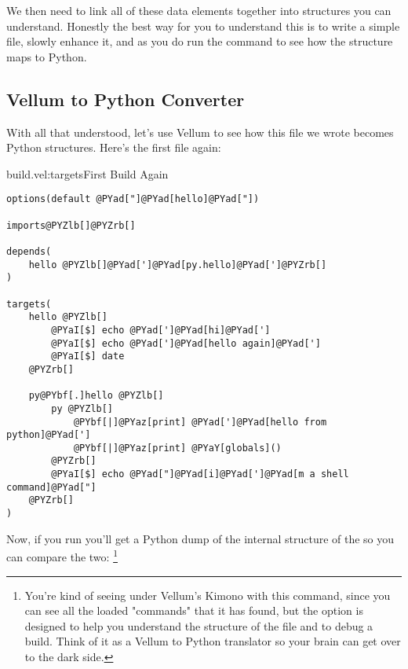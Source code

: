 We then need to link all of these data elements together into structures you can
understand.  Honestly the best way for you to understand this is to write a
simple  file, slowly enhance it, and as you do run the
 command to see how the structure maps to Python.

\subsection{Vellum to Python Converter}

With all that understood, let's use Vellum to see how this file we wrote becomes
Python structures.  Here's the first  file again:

\begin{code}{build.vel:targets}{First Build Again}
\begin{Verbatim}[commandchars=@\[\]]
options(default @PYad["]@PYad[hello]@PYad["])

imports@PYZlb[]@PYZrb[] 

depends(
    hello @PYZlb[]@PYad[']@PYad[py.hello]@PYad[']@PYZrb[]
)

targets(
    hello @PYZlb[]
        @PYaI[$] echo @PYad[']@PYad[hi]@PYad[']
        @PYaI[$] echo @PYad[']@PYad[hello again]@PYad[']
        @PYaI[$] date
    @PYZrb[]

    py@PYbf[.]hello @PYZlb[]
        py @PYZlb[] 
            @PYbf[|]@PYaz[print] @PYad[']@PYad[hello from python]@PYad[']
            @PYbf[|]@PYaz[print] @PYaY[globals]()
        @PYZrb[]
        @PYaI[$] echo @PYad["]@PYad[i]@PYad[']@PYad[m a shell command]@PYad["]
    @PYZrb[]
)
\end{Verbatim}

\end{code}

Now, if you run  you'll get a Python dump of the internal
structure of the  so you can compare the two:
\footnote{You're kind of seeing under Vellum's Kimono with this command, since you can see
all the loaded "commands" that it has found, but the  option is
designed to help you understand the structure of the file and to debug a build.
Think of it as a Vellum to Python translator so your brain can get over to the
dark side.}

